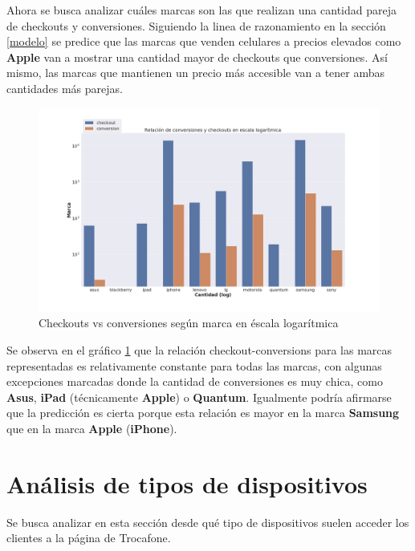 \documentclass[a4paper]{article}
\begin{document}
Ahora se busca analizar cuáles marcas son las que realizan una cantidad pareja de checkouts y conversiones. Siguiendo la linea de razonamiento en la sección \ref{modelo} se predice que las marcas que venden celulares a precios elevados como \textbf{Apple} van a mostrar una cantidad mayor de checkouts que conversiones. Así mismo, las marcas que mantienen un precio más accesible van a tener ambas cantidades más parejas. 

\begin{figure}[h!]
	\includegraphics[width=\linewidth]{figures/142-conversiones_checkouts_marca-barplot.png}
	\caption{Checkouts vs conversiones según marca en éscala logarítmica}
	\label{fig:brands}
\end{figure}

Se observa en el gráfico \ref{fig:brands} que la relación checkout-conversions para las marcas representadas es relativamente constante para todas las marcas, con algunas excepciones marcadas donde la cantidad de conversiones es muy chica, como \textbf{Asus}, \textbf{iPad} (técnicamente \textbf{Apple}) o \textbf{Quantum}. Igualmente podría afirmarse que la predicción es cierta porque esta relación es mayor en la marca \textbf{Samsung} que en la marca \textbf{Apple} (\textbf{iPhone}).

\section{Análisis de tipos de dispositivos}

Se busca analizar en esta sección desde qué tipo de dispositivos suelen acceder los clientes a la página de Trocafone.
\end{document}
